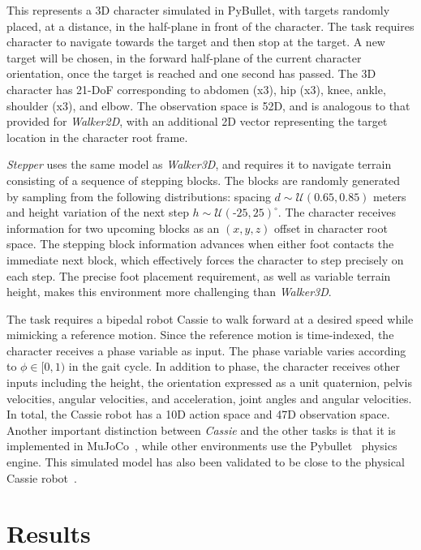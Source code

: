   This represents a 3D character simulated in PyBullet, with targets randomly placed, at a distance,
in the half-plane in front of the character.  
The task requires character to navigate towards the target and then stop at the target.  
A new target will be chosen, in the forward half-plane of the current character orientation, 
once the target is reached and one second has passed.  
The 3D character has 21-DoF corresponding to abdomen (x3), hip (x3), knee, ankle, shoulder (x3), and elbow.  
The observation space is 52D, and is analogous to that provided for {\it Walker2D},
with an additional 2D vector representing the target location in the character root frame.

  {\it Stepper} uses the same model as \textit{Walker3D}, and 
requires it to navigate terrain consisting of a sequence of stepping blocks.  
The blocks are randomly generated by sampling from the following distributions:
spacing $d \sim \mathcal{U}(0.65, 0.85)$ meters and height variation of the next step $h \sim \mathcal{U}(\text{-}25, 25)^{\circ}$.  
The character receives information for two upcoming blocks as an $(x,y,z)$ offset in character root space.  
The stepping block information advances when either foot contacts the immediate next block, 
which effectively forces the character to step precisely on each step.  
The precise foot placement requirement, as well as variable terrain height, makes this environment 
more challenging than \textit{Walker3D}.

  The task requires a bipedal robot Cassie to walk forward at a desired speed 
while mimicking a reference motion.  Since the reference motion is time-indexed, the character receives a phase variable as input.  
The phase variable varies according to $\phi \in [0,1)$ in the gait cycle.  
In addition to phase, the character receives other inputs including the height, the orientation expressed as a unit quaternion,
pelvis velocities, angular velocities, and acceleration, joint angles and angular velocities.  
In total, the Cassie robot has a 10D action space and 47D observation space.  
Another important distinction between {\it Cassie} and the other tasks is that it is implemented in 
MuJoCo~\citep{ref:Mujoco}, while other environments use the Pybullet~\citep{ref:Pybullet} physics engine. 
This simulated model has also been validated to be close to the 
physical Cassie robot~\cite{cassie-sim-to-real}.


\section{Results}

